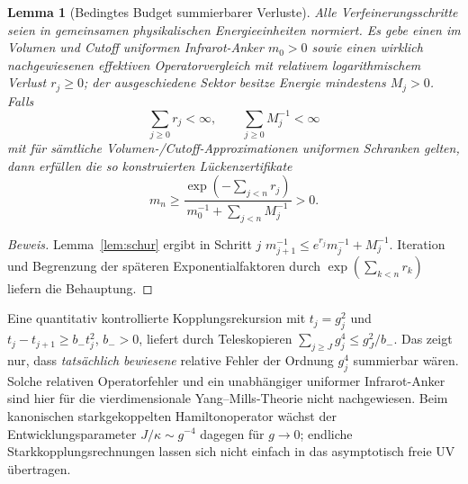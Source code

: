 \documentclass[11pt,a4paper]{article}
\newtheorem{lemma}[theorem]{Lemma}
\theoremstyle{remark}
\begin{document}
\begin{lemma}[Bedingtes Budget summierbarer Verluste]\label{lem:budget}
Alle Verfeinerungsschritte seien in
\emph{gemeinsamen physikalischen Energieeinheiten}
normiert. Es gebe einen im Volumen und Cutoff
uniformen Infrarot-Anker $m_0>0$ sowie einen
wirklich nachgewiesenen effektiven Operatorvergleich
mit relativem logarithmischem Verlust $r_j\ge0$;
der ausgeschiedene Sektor besitze Energie
mindestens $M_j>0$.
Falls
\[
\sum_{j\ge0}r_j<\infty,\qquad
\sum_{j\ge0}M_j^{-1}<\infty
\]
mit für sämtliche Volumen-/Cutoff-Approximationen
uniformen Schranken gelten, dann erfüllen
die so konstruierten Lückenzertifikate
\[
\boxed{\quad
m_n\ge\frac{\exp(-\sum_{j<n}r_j)}
{m_0^{-1}+\sum_{j<n}M_j^{-1}}>0.
\quad}
\]
\end{lemma}
\begin{proof}[Beweis]
Lemma~\ref{lem:schur} ergibt in Schritt $j$
$m_{j+1}^{-1}\le e^{r_j}m_j^{-1}+M_j^{-1}$.
Iteration und Begrenzung der späteren
Exponentialfaktoren durch
$\exp(\sum_{k<n}r_k)$ liefern die Behauptung.
\end{proof}
Eine quantitativ kontrollierte
Kopplungsrekursion mit $t_j=g_j^2$ und
$t_j-t_{j+1}\ge b_-t_j^2$, $b_->0$,
liefert durch Teleskopieren
$\sum_{j\ge J}g_j^4\le g_J^2/b_-$.
Das zeigt nur, dass \emph{tatsächlich
bewiesene} relative Fehler der Ordnung
$g_j^4$ summierbar wären.
Solche relativen Operatorfehler
und ein unabhängiger uniformer
Infrarot-Anker sind hier für die
vierdimensionale Yang--Mills-Theorie
nicht nachgewiesen.
Beim kanonischen starkgekoppelten
Hamiltonoperator wächst der
Entwicklungsparameter
$J/\kappa\sim g^{-4}$ dagegen
für $g\to0$; endliche
Starkkopplungsrechnungen
lassen sich nicht einfach in
das asymptotisch freie UV übertragen.
\end{document}
